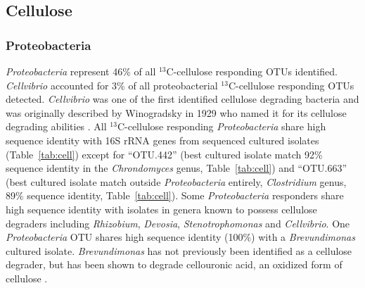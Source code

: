 \documentclass{article}
\begin{document}
\subsection{Cellulose}
\subsubsection{Proteobacteria}\label{cell:proteo}
\textit{Proteobacteria} represent 46\% of all $^{13}$C-cellulose responding
OTUs identified. \textit{Cellvibrio} accounted for 3\% of all proteobacterial
$^{13}$C-cellulose responding OTUs detected. \textit{Cellvibrio} was one of the
first identified cellulose degrading bacteria and was originally described by
Winogradsky in 1929 who named it for its cellulose degrading abilities
\citep{boone2001bergeys}. All $^{13}$C-cellulose responding
\textit{Proteobacteria} share high sequence identity with 16S rRNA genes from
sequenced cultured isolates (Table~\ref{tab:cell}) except for ``OTU.442'' (best
cultured isolate match 92\% sequence identity in the \textit{Chrondomyces}
genus, Table~\ref{tab:cell}) and ``OTU.663'' (best cultured isolate match
outside \textit{Proteobacteria} entirely, \textit{Clostridium} genus, 89\%
sequence identity, Table~\ref{tab:cell}). Some \textit{Proteobacteria}
responders share high sequence identity with isolates in genera known to
possess cellulose degraders including \textit{Rhizobium}, \textit{Devosia},
\textit{Stenotrophomonas} and \textit{Cellvibrio}. One \textit{Proteobacteria}
OTU shares high sequence identity (100\%) with a \textit{Brevundimonas} cultured
isolate.  \textit{Brevundimonas} has not previously been identified as a
cellulose degrader, but has been shown to degrade cellouronic acid, an oxidized
form of cellulose \citep{Tavernier_2008}.
\end{document}

